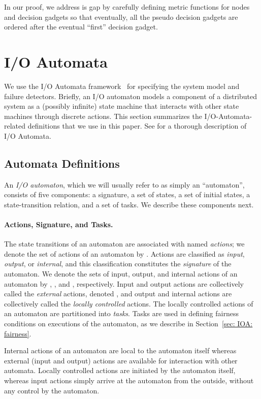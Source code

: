\documentclass[11pt]{article}
\numberwithin{theorem}{section}
\begin{document}
In our proof, we address is gap by carefully defining metric functions for nodes and decision gadgets so that eventually, all the pseudo decision gadgets are ordered after the eventual ``first'' decision gadget.

\section{I/O Automata}\label{sec:ioautomata}

We use the I/O Automata framework~\cite{lynch:hapf,lynch:aiti,lync:da}
for specifying the system model and failure detectors. 
Briefly, an I/O automaton models a component of a distributed system
as a (possibly infinite) state machine that interacts with other state
machines through discrete actions. 
This section summarizes the I/O-Automata-related definitions that we
use in this paper. 
See \cite[Chapter 8]{lync:da} for a thorough description of I/O
Automata.

\subsection{Automata Definitions}
\label{sec: IOA: automata-defs}

An \emph{I/O automaton}, which we will usually refer to as simply an
``automaton'', consists of five components:
a signature, a set of states, a set of initial states, a
state-transition relation, and a set of tasks. 
We describe these components next.

\paragraph{Actions, Signature, and Tasks.} 
The state transitions of an automaton are associated with named
\emph{actions}; we denote the set of actions of an automaton  by
.
Actions are classified as \emph{input}, \emph{output}, or
\emph{internal}, and this classification constitutes the
\emph{signature} of the automaton. 
We denote the sets of input, output, and internal actions of an
automaton  by , , and ,
respectively. 
Input and output actions are collectively called the \emph{external}
actions, denoted , and output and internal actions are
collectively called the \emph{locally controlled} actions. 
The locally controlled actions of an automaton are partitioned into
\emph{tasks}. 
Tasks are used in defining fairness conditions on executions of the
automaton, as we describe in Section~\ref{sec: IOA: fairness}.

Internal actions of an automaton are local to the automaton itself
whereas external (input and output) actions are available for
interaction with other automata.
Locally controlled actions are initiated by the automaton itself,
whereas input actions simply arrive at the automaton from the outside, 
without any control by the automaton.
\end{document}
